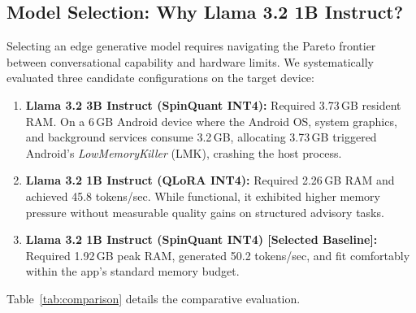 \documentclass[11pt,a4paper]{article}
\begin{document}
\subsection{Model Selection: Why Llama 3.2 1B Instruct?}
Selecting an edge generative model requires navigating the Pareto frontier between conversational capability and hardware limits. We systematically evaluated three candidate configurations on the target device:
\begin{enumerate}
    \item \textbf{Llama 3.2 3B Instruct (SpinQuant INT4):} Required 3.73\,GB resident RAM. On a 6\,GB Android device where the Android OS, system graphics, and background services consume 3.2\,GB, allocating 3.73\,GB triggered Android's \textit{LowMemoryKiller} (LMK), crashing the host process.
    \item \textbf{Llama 3.2 1B Instruct (QLoRA INT4):} Required 2.26\,GB RAM and achieved 45.8 tokens/sec. While functional, it exhibited higher memory pressure without measurable quality gains on structured advisory tasks.
    \item \textbf{Llama 3.2 1B Instruct (SpinQuant INT4) [Selected Baseline]:} Required 1.92\,GB peak RAM, generated 50.2 tokens/sec, and fit comfortably within the app's standard memory budget.
\end{enumerate}

Table~\ref{tab:comparison} details the comparative evaluation.

\begin{table}[ht!]
\centering
{}
\caption{Comparative trade-off evaluation of Llama edge variants on Arm architecture.}
\label{tab:comparison}
\end{table}
\end{document}
